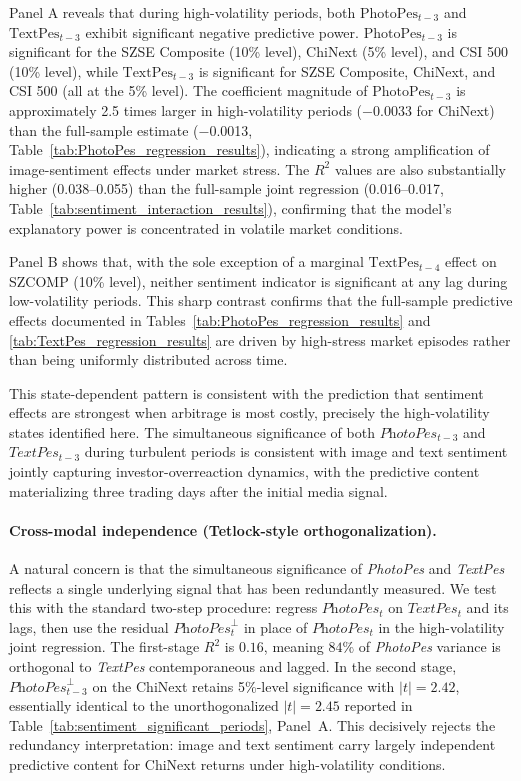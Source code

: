 \documentclass[AER]{AEA}
\begin{document}
Panel A reveals that during high-volatility periods, both $\text{PhotoPes}_{t-3}$ and $\text{TextPes}_{t-3}$ exhibit significant negative predictive power. $\text{PhotoPes}_{t-3}$ is significant for the SZSE Composite (10\% level), ChiNext (5\% level), and CSI 500 (10\% level), while $\text{TextPes}_{t-3}$ is significant for SZSE Composite, ChiNext, and CSI 500 (all at the 5\% level). The coefficient magnitude of $\text{PhotoPes}_{t-3}$ is approximately 2.5 times larger in high-volatility periods ($-$0.0033 for ChiNext) than the full-sample estimate ($-$0.0013, Table~\ref{tab:PhotoPes_regression_results}), indicating a strong amplification of image-sentiment effects under market stress. The $R^2$ values are also substantially higher (0.038--0.055) than the full-sample joint regression (0.016--0.017, Table~\ref{tab:sentiment_interaction_results}), confirming that the model's explanatory power is concentrated in volatile market conditions.

Panel B shows that, with the sole exception of a marginal $\text{TextPes}_{t-4}$ effect on SZCOMP (10\% level), neither sentiment indicator is significant at any lag during low-volatility periods. This sharp contrast confirms that the full-sample predictive effects documented in Tables~\ref{tab:PhotoPes_regression_results} and \ref{tab:TextPes_regression_results} are driven by high-stress market episodes rather than being uniformly distributed across time.

This state-dependent pattern is consistent with the \citet{baker2007investor} prediction that sentiment effects are strongest when arbitrage is most costly, precisely the high-volatility states identified here. The simultaneous significance of both $\textit{PhotoPes}_{t-3}$ and $\textit{TextPes}_{t-3}$ during turbulent periods is consistent with image and text sentiment jointly capturing investor-overreaction dynamics, with the predictive content materializing three trading days after the initial media signal.

\paragraph{Cross-modal independence (Tetlock-style orthogonalization).} A natural concern is that the simultaneous significance of \textit{PhotoPes} and \textit{TextPes} reflects a single underlying signal that has been redundantly measured. We test this with the standard \citet{tetlock2007giving} two-step procedure: regress $\textit{PhotoPes}_t$ on $\textit{TextPes}_t$ and its lags, then use the residual $\textit{PhotoPes}^{\perp}_t$ in place of $\textit{PhotoPes}_t$ in the high-volatility joint regression. The first-stage $R^2$ is $0.16$, meaning $84\%$ of \textit{PhotoPes} variance is orthogonal to \textit{TextPes} contemporaneous and lagged. In the second stage, $\textit{PhotoPes}^{\perp}_{t-3}$ on the ChiNext retains 5\%-level significance with $|t|=2.42$, essentially identical to the unorthogonalized $|t|=2.45$ reported in Table~\ref{tab:sentiment_significant_periods}, Panel~A. This decisively rejects the redundancy interpretation: image and text sentiment carry largely independent predictive content for ChiNext returns under high-volatility conditions.
\end{document}
